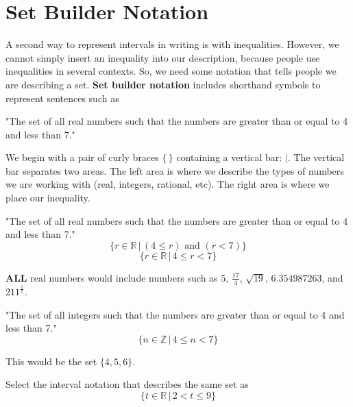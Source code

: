 \documentclass{ximera}
\begin{document}
\section{Set Builder Notation}

A second way to represent intervals in writing is with inequalities. However, we cannot simply insert an inequality into our description, because people use inequalities in several contexts.  So, we need some notation that tells people we are describing a set. \textbf{Set builder notation} includes shorthand symbols to represent sentences such as 

\begin{center}
"The set of all real numbers such that the numbers are greater than or equal to 4 and less than 7."
\end{center}

We begin with a pair of curly braces $\{  \, \}$ containing a vertical bar:  ${|}$.  The vertical bar separates two areas. The left area is where we describe the types of numbers we are working with (real, integers, rational, etc).  The right area is where we place our inequality.

\begin{example}
"The set of all real numbers such that the numbers are greater than or equal to 4 and less than 7."
\[ \{ r \in \mathbb {R} \, | \, (4 \leq r)  \text{ and } (r < 7) \} \]
\[ \{ r \in \mathbb {R} \, | \, 4 \leq r < 7 \} \]

\begin{explanation}
\textbf{ALL} real numbers would include numbers such as $5$, $\frac{17}{4}$, $\sqrt{19}$, $6.354987263$, and $211^{\tfrac{1}{\pi}}$.
\end{explanation}
\end{example}



\begin{example}
"The set of all integers such that the numbers are greater than or equal to 4 and less than 7."
\[ \{ n \in \mathbb {Z} \, | \, 4 \leq n < 7 \} \]

\begin{explanation}
This would be the set $\{ 4, 5, 6 \}$.
\end{explanation}
\end{example}




\begin{question}
Select the interval notation that describes the same set as 
\[ \{ t \in \mathbb {R} \, | \, 2 < t \leq 9 \} \]
	\begin{multipleChoice}
	\choice {$[9, 2)$}
	\choice {$[2, 9)$}
	\choice [correct]{$(2, 9]$}
	\choice {$[2, 9]$}
	\end{multipleChoice}
\end{question}
\end{document}
